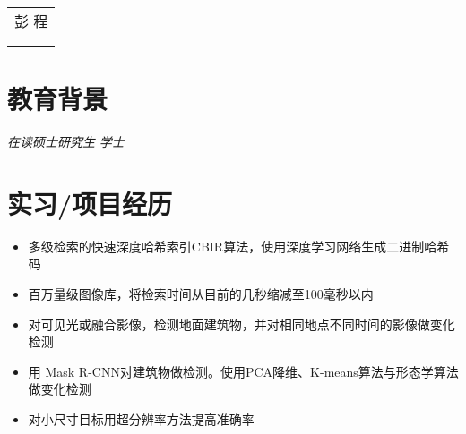 \documentclass{resume}
\begin{document}

\begin{minipage}{0.7\textwidth}
  \Large{
    \begin{tabu}  { l }
      \scshape{彭 \quad  程} \\
       \\
       \\
    \end{tabu}
  }
\end{minipage}

\section{ 教育背景}
\textit{在读硕士研究生} 
\textit{学士}

\section{ 实习/项目经历}

\begin{itemize}[topsep = 0 pt, partopsep = 0pt]
  \item 多级检索的快速深度哈希索引CBIR算法，使用深度学习网络生成二进制哈希码
  \item 百万量级图像库，将检索时间从目前的几秒缩减至100毫秒以内
\end{itemize}


\begin{itemize}[topsep = 0 pt, partopsep = 0pt]
  \item 对可见光或融合影像，检测地面建筑物，并对相同地点不同时间的影像做变化检测
  \item 用 Mask R-CNN对建筑物做检测。使用PCA降维、K-means算法与形态学算法做变化检测
  \item 对小尺寸目标用超分辨率方法提高准确率
\end{itemize}
\end{document}
